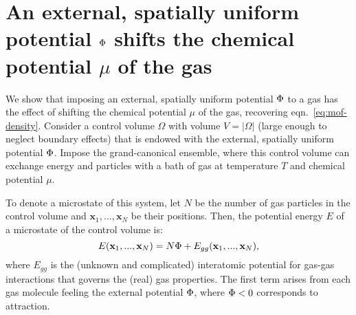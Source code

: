 \setcounter{table}{0}
\renewcommand{\thetable}{S\arabic{table}}%
\setcounter{figure}{0}
\renewcommand{\thefigure}{S\arabic{figure}}%
\renewcommand{\thesection}{SI \Alph{section}}%

\section{An external, spatially uniform potential $\Phi$ shifts the chemical potential $\mu$ of the gas} \label{sec:V_shifts_chem_pot}
We show that imposing an external, spatially uniform potential $\Phi$ to a gas has the effect of shifting the chemical potential $\mu$ of the gas, recovering eqn.~\ref{eq:mof-density}. Consider a control volume $\Omega$ with volume $V=|\Omega|$ (large enough to neglect boundary effects) that is endowed with the external, spatially uniform potential $\Phi$. Impose the grand-canonical ensemble, where this control volume can exchange energy and particles with a bath of gas at temperature $T$ and chemical potential $\mu$.

To denote a microstate of this system, let $N$ be the number of gas particles in the control volume and $\mathbf{x}_1,...,\mathbf{x}_N$ be their positions. Then, the potential energy $E$ of a microstate of the control volume is:
\begin{equation}
    E(\mathbf{x}_1,...,\mathbf{x}_N) = N\Phi + E_{gg}(\mathbf{x}_1,...,\mathbf{x}_N),
\end{equation} where $E_{gg}$ is the (unknown and complicated) interatomic potential for gas-gas interactions that governs the (real) gas properties. The first term arises from each gas molecule feeling the external potential $\Phi$, where $\Phi < 0$ corresponds to attraction.


